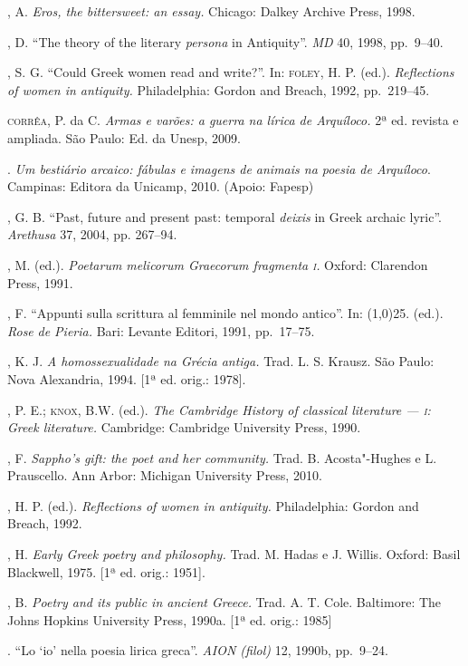 \begin{bibliohedra}
, A. \textit{Eros, the bittersweet: an essay.} Chicago:
Dalkey Archive Press, 1998.

, D. “The theory of the literary \textit{persona} in Antiquity”.
\textit{MD} 40, 1998, pp.~9--40.

, S. G. “Could Greek women read and write?”. In: \textsc{foley}, H.
P. (ed.). \textit{Reflections of women in antiquity.} Philadelphia: Gordon and
Breach, 1992, pp.~219--45.

\textsc{corrêa}, P. da C. \textit{Armas e varões: a guerra na
lírica de Arquíloco.} 2ª ed. revista e ampliada. São Paulo: Ed. da Unesp, 2009.

\titidem. \textit{Um bestiário arcaico: fábulas e imagens
de animais na poesia de Arquíloco}. Campinas: Editora da Unicamp, 2010. (Apoio:
Fapesp)

, G. B. “Past, future and present past: temporal
\textit{deixis} in Greek archaic lyric”. \textit{Arethusa} 37, 2004, pp.
267--94.

, M. (ed.). \textit{Poetarum melicorum Graecorum fragmenta \textsc{i}.}
Oxford: Clarendon Press, 1991.

, F. “Appunti sulla scrittura al femminile nel mondo antico''.
In: \line(1,0){25}. (ed.). \textit{Rose} \textit{de Pieria.} Bari: Levante Editori,
1991, pp.~17--75.

, K. J.  \textit{A homossexualidade na Grécia antiga.}
Trad. L. S. Krausz. São Paulo: Nova Alexandria, 1994. [1ª ed. orig.: 1978].

, P. E.; \textsc{knox}, B.W. (ed.). \textit{The Cambridge History of
classical literature --- \textsc{i}: Greek literature.} Cambridge: Cambridge University
Press, 1990.

, F. \textit{Sappho’s gift: the poet and her community.} Trad.
B. Acosta"-Hughes e L. Prauscello. Ann Arbor: Michigan University Press, 2010.

, H. P. (ed.). \textit{Reflections of women in antiquity.}
Philadelphia: Gordon and Breach, 1992.

, H. \textit{Early Greek poetry and philosophy.} Trad. M. Hadas
e J. Willis. Oxford: Basil Blackwell, 1975. [1ª ed. orig.: 1951]. 

, B. \textit{Poetry and its public in ancient Greece.} Trad. A.
T. Cole. Baltimore: The Johns Hopkins University Press, 1990a.
[1ª ed. orig.: 1985]

\titidem. “Lo ‘io’ nella poesia lirica greca”. \textit{AION (filol)} 12,
1990b, pp.~9--24.


\end{bibliohedra}
